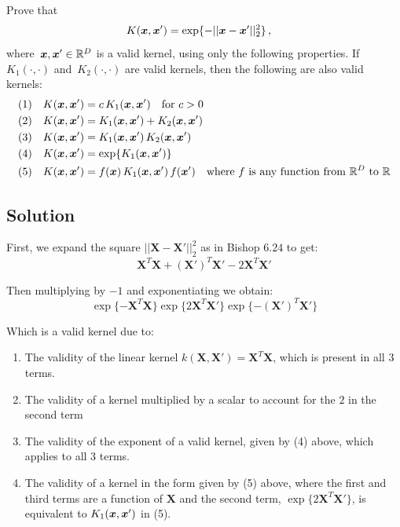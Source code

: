 \documentclass[submit]{harvardml}
\begin{document}
\newpage
\begin{problem}
Prove that
\begin{align*}
	K(\boldsymbol{x}, \boldsymbol{x}') &= \exp\{ -||\boldsymbol{x} - \boldsymbol{x}'||^2_2 \}\,,
\end{align*}
where~$\boldsymbol{x},\boldsymbol{x}'\in\mathbb{R}^D$ is a valid kernel, using only the following
properties.  If~$K_1(\cdot,\cdot)$ and~$K_2(\cdot,\cdot)$ are valid kernels,
then the following are also valid kernels:
\begin{align*}
	(1) \quad K(\boldsymbol{x}, \boldsymbol{x}') &= c\,K_1(\boldsymbol{x}, \boldsymbol{x}') \quad \text{for $c>0$}\\
	(2) \quad K(\boldsymbol{x}, \boldsymbol{x}') &= K_1(\boldsymbol{x}, \boldsymbol{x}') + K_2(\boldsymbol{x}, \boldsymbol{x}')\\
	(3) \quad K(\boldsymbol{x}, \boldsymbol{x}') &= K_1(\boldsymbol{x}, \boldsymbol{x}')\,K_2(\boldsymbol{x}, \boldsymbol{x}')\\
	(4) \quad K(\boldsymbol{x}, \boldsymbol{x}') &= \exp\{ K_1(\boldsymbol{x}, \boldsymbol{x}') \}\\
    (5) \quad K(\boldsymbol{x}, \boldsymbol{x}') &= f(\boldsymbol{x})\,K_1(\boldsymbol{x}, \boldsymbol{x}')\,f(\boldsymbol{x}') \quad
  \text{where $f$ is any function from~$\mathbb{R}^D$ to $\mathbb{R}$}
\end{align*}

 \end{problem}
\subsection*{Solution}

First, we expand the square $||\mathbf{X}-\mathbf{X}'||_2^2$ as in Bishop $6.24$ to get:
\[
\mathbf{X}^T\mathbf{X}+(\mathbf{X}')^T\mathbf{X}'-2\mathbf{X}^T\mathbf{X}'
\]

\noindent
Then multiplying by $-1$ and exponentiating we obtain:
\[
\exp\{-\mathbf{X}^T\mathbf{X}\}\exp\{2\mathbf{X}^T\mathbf{X}'\}\exp\{-(\mathbf{X}')^T\mathbf{X}'\}
\]

\noindent
Which is a valid kernel due to:
\begin{enumerate}
	\item The validity of the linear kernel $k(\mathbf{X},\mathbf{X'})=\mathbf{X}^T\mathbf{X}$, which is present in all 3 terms.
	\item The validity of a kernel multiplied by a scalar to account for the $2$ in the second term
	\item The validity of the exponent of a valid kernel, given by (4) above, which applies to all 3 terms.
	\item The validity of a kernel in the form given by (5) above, where the first and third terms are a function of $\mathbf{X}$ and the second term, $\exp\{2\mathbf{X}^T\mathbf{X}'\}$, is equivalent to $K_1(\boldsymbol{x}, \boldsymbol{x}')$ in (5).
\end{enumerate}
\end{document}
